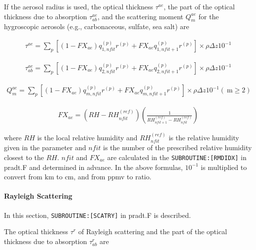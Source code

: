 If the aerosol radius is used, the optical thickness \(\tau^{a e}\), the
part of the optical thickness due to absorption \(\tau_{ab}^{a e}\), and
the scattering moment \(Q_{m}^{a e}\) for the hygroscopic aerosols
(e.g., carbonaceous, sulfate, sea salt) are

\begin{eqnarray}
\tau^{a e}=\sum_{p}\left[\left(1-F X_{a e}\right) q_{1, n f i t}^{(p)} r^{(p)}+F X_{a e} q_{1, n f i t+1}^{(p)} r^{(p)}\right] \times \rho \Delta z 10^{-1}
\end{eqnarray}

\begin{eqnarray}
\tau_{ab}^{a e}=\sum_{p}\left[\left(1-F X_{a e}\right) q_{2, n f i t}^{(p)} r^{(p)}+F X_{a e} q_{2, n f i t+1}^{(p)} r^{(p)}\right] \times \rho \Delta z 10^{-1}
\end{eqnarray}

\begin{eqnarray}
Q_{m}^{a e}=\sum_{p}\left[\left(1-F X_{a e}\right) q_{m, n f i t}^{(p)} r^{(p)}+F X_{a e} q_{m, n f i t+1}^{(p)} r^{(p)}\right] \times \rho \Delta z 10^{-1}(\mathrm{~m} \geq 2)
\end{eqnarray}

\begin{eqnarray}
F X_{a e}=\left(R H-R H_{n f i t}^{(r e f)}\right)\left(\frac{1}{R H_{n f i t+1}^{(r e f)}-R H_{n f i t}^{(r e f)}}\right)
\end{eqnarray}

where \(RH\) is the local relative humidity and
\(R H_{n f i t}^{(r e f)}\) is the relative humidity given in the
parameter and \(nfit\) is the number of the prescribed relative humidity
closest to the \(RH\). \(nfit\) and \(FX_{ae}\) are calculated in the
\texttt{SUBROUTINE:{[}RMDIDX{]}} in pradt.F and determined in advance.
In the above formulas, \(10^{-1}\) is multiplied to convert from
\(\mathrm{km}\) to \(\mathrm{cm}\), and from ppmv to ratio.

\hypertarget{rayleigh-scattering}{%
\paragraph{Rayleigh Scattering}\label{rayleigh-scattering}}

In this section, \texttt{SUBROUTINE:{[}SCATRY{]}} in pradt.F is
described.

The optical thickness \(\tau^{r}\) of Rayleigh scattering and the part
of the optical thickness due to absorption \(\tau_{ab}^{r}\) are

